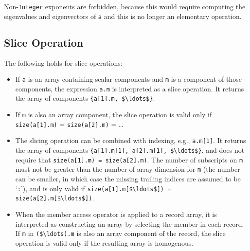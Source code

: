 \begin{nonnormative}
Non-\lstinline!Integer! exponents are forbidden, because this would require
computing the eigenvalues and eigenvectors of \lstinline!a! and this is no
longer an elementary operation.
\end{nonnormative}

\subsection{Slice Operation}\label{slice-operation}

The following holds for slice operations:
\begin{itemize}
\item
  If \lstinline!a! is an array containing scalar components and \lstinline!m! is a component of those components, the expression \lstinline!a.m! is interpreted as a
  slice operation.  It returns the array of components \lstinline!{a[1].m, $\ldots$}!.
\item
  If \lstinline!m! is also an array component, the slice operation is valid only if \lstinline!size(a[1].m)! = \lstinline!size(a[2].m)! = \ldots
\item
  The slicing operation can be combined with indexing, e.g., \lstinline!a.m[1]!.  It returns the array of components \lstinline!{a[1].m[1], a[2].m[1], $\ldots$}!,
  and does not require that \lstinline!size(a[1].m) = size(a[2].m)!.  The number of subscripts on \lstinline!m! must not be greater than the number of array dimension
  for \lstinline!m! (the number can be smaller, in which case the missing trailing indices are assumed to be `\lstinline!:!'), and is only valid if
  \lstinline!size(a[1].m[$\ldots$]) = size(a[2].m[$\ldots$])!.
\item
  When the member access operator is applied to a record array, it is interpreted as constructing an array by selecting the member in each record.
  If \lstinline!m! in \lstinline!($\ldots).m! is also an array component of the record, the slice operation is valid only if the resulting array is homogenous.
\end{itemize}

